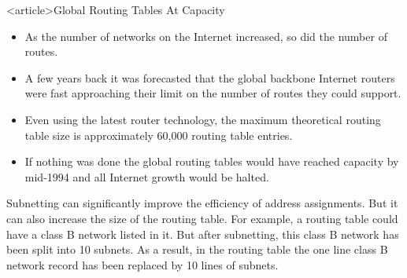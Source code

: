 
\begin{frame}<article>{Global Routing Tables At Capacity}
  \begin{itemize}
  \item As the number of networks on the Internet increased, so did the number of routes.
  \item A few years back it was forecasted that the global backbone Internet routers were
    fast approaching their limit on the number of routes they could support.
  \item Even using the latest router technology, the maximum theoretical routing table
    size is approximately 60,000 routing table entries.
  \item If nothing was done the global routing tables would have reached capacity by
    mid-1994 and all Internet growth would be halted.
  \end{itemize}
\end{frame}

Subnetting can significantly improve the efficiency of address assignments. But it can
also increase the size of the routing table. For example, a routing table could have a
class B network listed in it. But after subnetting, this class B network has been split
into 10 subnets. As a result, in the routing table the one line class B network record has
been replaced by 10 lines of subnets.



